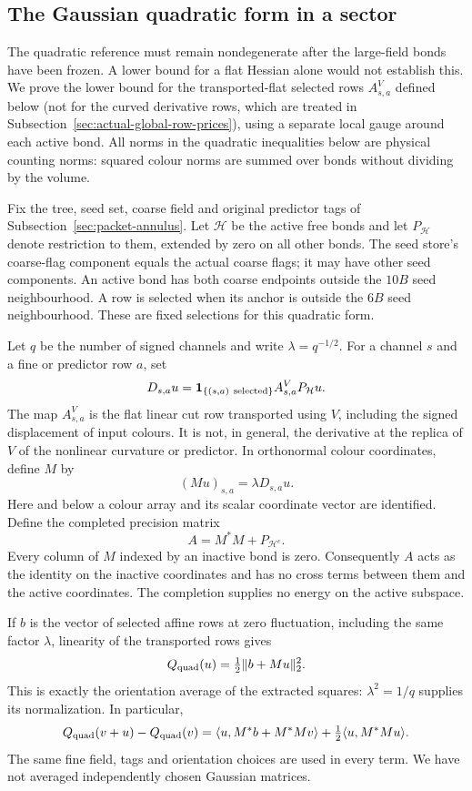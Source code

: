 \subsection{The Gaussian quadratic form in a sector}
\label{sec:sector-gram}
The quadratic reference must remain nondegenerate after the large-field
bonds have been frozen. A lower bound for a flat Hessian alone would
not establish this. We prove the lower bound for the transported-flat selected rows
$A^V_{s,a}$ defined below (not for the curved derivative rows, which
are treated in Subsection~\ref{sec:actual-global-row-prices}), using a separate local gauge around each active bond.
All norms in the quadratic inequalities below are physical counting
norms: squared colour norms are summed over bonds without dividing
by the volume.

Fix the tree, seed set, coarse field and original predictor tags of
Subsection~\ref{sec:packet-annulus}. Let $\mathcal H$ be the active
free bonds and let $P_{\mathcal H}$ denote restriction to them,
extended by zero on all other bonds. The seed store's coarse-flag
component equals the actual coarse flags; it may have other seed
components. An active bond has both coarse endpoints outside
the $10B$ seed neighbourhood. A row is selected when its anchor
is outside the $6B$ seed neighbourhood. These are fixed selections
for this quadratic form.

Let $q$ be the number of signed channels and write
$\lambda=q^{-1/2}$. For a channel $s$ and a fine or predictor
row $a$, set
\[
 D_{s,a}u={\bf1}_{\{(s,a)\ \text{selected}\}}
             A^V_{s,a}P_{\mathcal H}u.
\]
The map $A^V_{s,a}$ is the flat linear cut row transported using $V$,
including the signed displacement of input colours. It is not, in general,
the derivative at the replica of $V$ of the nonlinear curvature or predictor. In
orthonormal colour coordinates, define $M$ by
\[
 (Mu)_{s,a}=\lambda D_{s,a}u.
\]
Here and below a colour array and its scalar coordinate vector are
identified. Define the completed precision matrix
\begin{equation}\label{eq:sector-precision}
 A=M^*M+P_{\mathcal H^c}.
\end{equation}
Every column of $M$ indexed by an inactive bond is zero.
Consequently $A$ acts as the identity on the inactive coordinates
and has no cross terms between them and the active coordinates.
The completion supplies no energy on the active subspace.

If $b$ is the vector of selected affine rows at zero fluctuation,
including the same factor $\lambda$, linearity of the transported
rows gives
\[
 Q_{\rm quad}(u)=\tfrac12\|b+Mu\|_2^2.
\]
This is exactly the orientation average of the extracted squares:
$\lambda^2=1/q$ supplies its normalization. In particular,
\[
 Q_{\rm quad}(v+u)-Q_{\rm quad}(v)
 =\langle u,M^*b+M^*Mv\rangle
       +\tfrac12\langle u,M^*Mu\rangle.
\]
The same fine field, tags and orientation choices are used in every
term. We have not averaged independently chosen Gaussian matrices.

